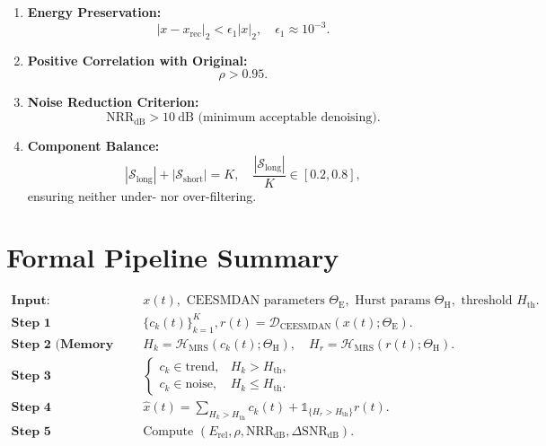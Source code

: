 \documentclass[11pt]{article}
\begin{document}
\begin{enumerate}
  \item \textbf{Energy Preservation:}
\[
|x - x_{\text{rec}}|_2 < \epsilon_1 |x|_2, \quad \epsilon_1 \approx 10^{-3}.
\]

  \item \textbf{Positive Correlation with Original:}
\[
\rho > 0.95.
\]

  \item \textbf{Noise Reduction Criterion:}
\[
\mathrm{NRR}_{\text{dB}} > 10~\text{dB (minimum acceptable denoising)}.
\]

  \item \textbf{Component Balance:}
\[
|\mathcal{S}_{\text{long}}| + |\mathcal{S}_{\text{short}}| = K, \quad
\frac{|\mathcal{S}_{\text{long}}|}{K} \in [0.2, 0.8],
\]
ensuring neither under- nor over-filtering.

\end{enumerate}



\section{Formal Pipeline Summary}
\[
\boxed{
\begin{aligned}
\textbf{Input:} &\quad x(t), \text{ CEESMDAN parameters } \Theta_{\text{E}}, \text{ Hurst params } \Theta_{\text{H}}, \text{ threshold } H_{\text{th}}.\\[4pt]
\textbf{Step 1 (Decomposition):}&\quad \{c_k(t)\}_{k=1}^K, r(t) = \mathcal{D}_{\text{CEESMDAN}}(x(t);\Theta_{\text{E}}).\\[4pt]
\textbf{Step 2 (Memory Analysis):}&\quad H_k = \mathcal{H}_{\text{MRS}}(c_k(t);\Theta_{\text{H}}),\quad H_r = \mathcal{H}_{\text{MRS}}(r(t);\Theta_{\text{H}}).\\[4pt]
\textbf{Step 3 (Classification):}&\quad
\begin{cases}
c_k \in \text{trend}, & H_k > H_{\text{th}},\\
c_k \in \text{noise}, & H_k \le H_{\text{th}}.
\end{cases}\\[4pt]
\textbf{Step 4 (Reconstruction):}&\quad
\hat{x}(t) = \sum_{H_k > H_{\text{th}}} c_k(t) + \mathbb{1}_{\{H_r>H_{\text{th}}\}} r(t).\\[4pt]
\textbf{Step 5 (Validation):}&\quad
\text{Compute } (E_{\text{rel}}, \rho, \mathrm{NRR}_{\text{dB}}, \Delta\mathrm{SNR}_{\text{dB}}).
\end{aligned}
}
\]
\end{document}
